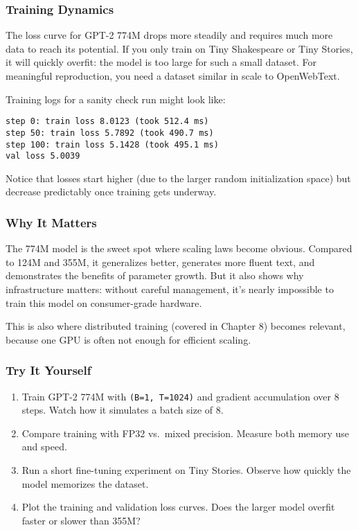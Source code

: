 \documentclass[
  letterpaper,
  DIV=11,
  numbers=noendperiod]{scrreprt}
\providecommand{\tightlist}{%
  \setlength{\itemsep}{0pt}\setlength{\parskip}{0pt}}
\begin{document}
\subsubsection{Training Dynamics}\label{training-dynamics}

The loss curve for GPT-2 774M drops more steadily and requires much more
data to reach its potential. If you only train on Tiny Shakespeare or
Tiny Stories, it will quickly overfit: the model is too large for such a
small dataset. For meaningful reproduction, you need a dataset similar
in scale to OpenWebText.

Training logs for a sanity check run might look like:

\begin{verbatim}
step 0: train loss 8.0123 (took 512.4 ms)
step 50: train loss 5.7892 (took 490.7 ms)
step 100: train loss 5.1428 (took 495.1 ms)
val loss 5.0039
\end{verbatim}

Notice that losses start higher (due to the larger random initialization
space) but decrease predictably once training gets underway.

\subsubsection{Why It Matters}\label{why-it-matters-67}

The 774M model is the sweet spot where scaling laws become obvious.
Compared to 124M and 355M, it generalizes better, generates more fluent
text, and demonstrates the benefits of parameter growth. But it also
shows why infrastructure matters: without careful management, it's
nearly impossible to train this model on consumer-grade hardware.

This is also where distributed training (covered in Chapter 8) becomes
relevant, because one GPU is often not enough for efficient scaling.

\subsubsection{Try It Yourself}\label{try-it-yourself-81}

\begin{enumerate}
\def\labelenumi{\arabic{enumi}.}
\tightlist
\item
  Train GPT-2 774M with \texttt{(B=1,\ T=1024)} and gradient
  accumulation over 8 steps. Watch how it simulates a batch size of 8.
\item
  Compare training with FP32 vs.~mixed precision. Measure both memory
  use and speed.
\item
  Run a short fine-tuning experiment on Tiny Stories. Observe how
  quickly the model memorizes the dataset.
\item
  Plot the training and validation loss curves. Does the larger model
  overfit faster or slower than 355M?
\end{enumerate}
\end{document}
